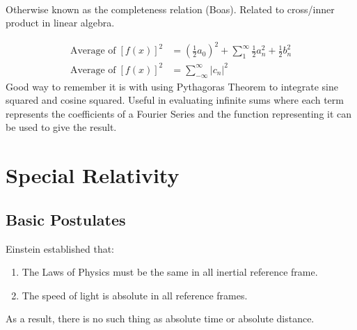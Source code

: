 \documentclass[12pt]{article}
\begin{document}
\paragraph{} Otherwise known as the completeness relation (Boas). Related to cross/inner product in linear algebra. 

\begin{align*}
\text{Average of} \; [f(x)]^2 &= (\frac12 a_0)^2 + \sum^\infty_1 \frac12 a_n^2 + \frac12 b_n^2 \\
\text{Average of} \; [f(x)]^2 &= \sum^\infty_{-\infty} |c_n|^2
\end{align*}
Good way to remember it is with using Pythagoras Theorem to integrate sine squared and cosine squared. Useful in evaluating infinite sums where each term represents the coefficients of a Fourier Series and the function representing it can be used to give the result.

\section{Special Relativity}

\subsection{Basic Postulates}
Einstein established that:
\begin{enumerate}
    \item The Laws of Physics must be the same in all inertial reference frame.
    \item The speed of light is absolute in all reference frames.
\end{enumerate}
As a result, there is no such thing as absolute time or absolute distance. 
\end{document}
